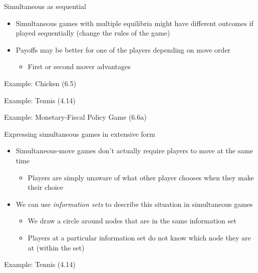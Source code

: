\documentclass[10pt]{beamer}
\begin{document}
\begin{frame}[label={sec:org2c59a94}]{}
\alert{Simultaneous as sequential}
\begin{itemize}
\item Simultaneous games with multiple equilibria might have different outcomes if played sequentially (change the rules of the game)
\item Payoffs may be better for one of the players depending on move order
\begin{itemize}
\item First or second mover advantages
\end{itemize}
\end{itemize}
\end{frame}

\begin{frame}[label={sec:org9859aec}]{Example: Chicken (6.5)}
\end{frame}

\begin{frame}[label={sec:orge31e862}]{Example: Tennis (4.14)}
\end{frame}

\begin{frame}[label={sec:org2a3d191}]{Example: Monetary-Fiscal Policy Game (6.6a)}
\end{frame}

\begin{frame}[label={sec:org1a0aa76}]{}
\alert{Expressing simultaneous games in extensive form}
\begin{itemize}
\item Simultaneous-move games don't actually require players to move at the same time
\begin{itemize}
\item Players are simply unaware of what other player chooses when they make their choice
\end{itemize}
\item We can use \emph{information sets} to describe this situation in simultaneous games
\begin{itemize}
\item We draw a circle around nodes that are in the same information set
\item Players at a particular information set do not know which node they are at (within the set)
\end{itemize}
\end{itemize}
\end{frame}

\begin{frame}[label={sec:orge703de7}]{Example: Tennis (4.14)}
\end{frame}
\end{document}
